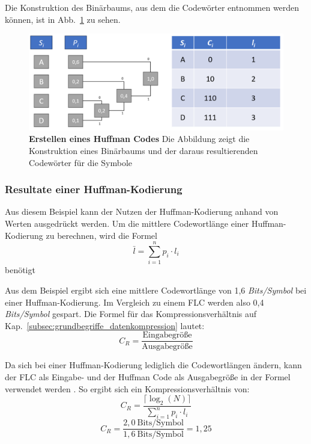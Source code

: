 Die Konstruktion des Binärbaums, aus dem die Codewörter entnommen werden können, ist in Abb.~\ref{fig:huffman_example} zu sehen.

\begin{figure}[htb]
  \centering  
  \includegraphics[scale=0.4]{Bilder/Huffmancode_beispiel.png}
  \caption[Huffman Code Beispiel]{\textbf{Erstellen eines Huffman Codes} Die Abbildung zeigt die Konstruktion eines Binärbaums und der daraus resultierenden Codewörter für die Symbole}
  \label{fig:huffman_example}
\end{figure}

\subsubsection{Resultate einer Huffman-Kodierung}
\label{subsec:huffman_res}
Aus diesem Beispiel kann der Nutzen der Huffman-Kodierung anhand von Werten ausgedrückt werden. \newline
Um die mittlere Codewortlänge einer Huffman-Kodierung zu berechnen, wird die Formel
\begin{equation*}
\bar{l} = \sum_{i=1}^{n} p_i \cdot l_i
\end{equation*}
benötigt \newline

Aus dem Beispiel ergibt sich eine mittlere Codewortlänge von 1,6 \textit{Bits/Symbol} bei einer Huffman-Kodierung.
Im Vergleich zu einem FLC werden also 0,4 \textit{Bits/Symbol} gespart. 
Die Formel für das Kompressionsverhältnis auf Kap.~\ref{subsec:grundbegriffe_datenkompression} lautet:
\begin{equation*}
C_R = \frac{\text{Eingabegröße}}{\text{Ausgabegröße}}
\end{equation*}

Da sich bei einer Huffman-Kodierung lediglich die Codewortlängen ändern, kann der FLC als Eingabe- und der Huffman Code als Ausgabegröße in der Formel verwendet werden \cite{Strutz2009}.
So ergibt sich ein Kompressionsverhältnis von:
\begin{equation*}
C_R = \frac{\lceil \log_2(N) \rceil}{\sum_{i=1}^{n} p_i \cdot l_i}
\end{equation*}
\begin{equation*}
C_R = \frac{2,0 \ \text{Bits/Symbol}}{1,6 \ \text{Bits/Symbol}} = 1,25
\end{equation*}


